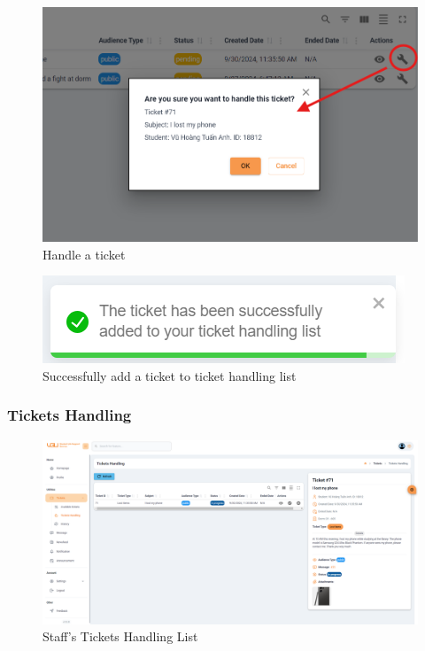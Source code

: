 	\begin{figure}[H]
		\centering
		\includegraphics[width=0.8\linewidth]{graphics/gui/staff/avail-ticket-handle}
		\caption{Handle a ticket}
		\label{fig:gui-st-avail-ticket-handle}
	\end{figure}
	
	
	\begin{figure}[H]
		\centering
		\includegraphics[width=0.5\linewidth]{graphics/gui/staff/avail-ticket-handle-success}
		\caption{Successfully add a ticket to ticket handling list}
		\label{fig:gui-st-avail-ticket-handle-success}
	\end{figure}
	
	
	\subsubsection{Tickets Handling}
	\begin{figure}[H]
		\centering
		\includegraphics[width=1\linewidth]{graphics/gui/staff/ticket-handling}
		\caption{Staff's Tickets Handling List}
		\label{fig:gui-st-ticket-handling}
	\end{figure}
	
